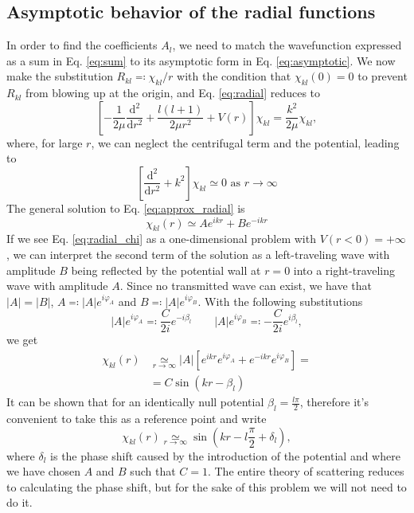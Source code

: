 \subsection{Asymptotic behavior of the radial functions}
In order to find the coefficients \(A_l\), we need to match the wavefunction expressed as a sum in Eq. \eqref{eq:sum} to its asymptotic form in Eq. \eqref{eq:asymptotic}. We now make the substitution \(R_{kl} \eqqcolon \chi_{kl} / r\) with the condition that \(\chi_{kl} (0)=0\) to prevent \(R_{kl} \) from blowing up at the origin, and Eq. \eqref{eq:radial} reduces to
\begin{equation}\label{eq:radial_chi}
	\left[- \frac{1}{2\mu }\frac{\mathrm{d}^2}{\mathrm{d}r^2} + \frac{l(l+1)}{2\mu r^2}+ V(r)\right]\chi_{kl} = \frac{k^2}{2\mu }\chi_{kl},
\end{equation}
where, for large \(r\), we can neglect the centrifugal term and the potential, leading to
\begin{equation}\label{eq:approx_radial}
	\left[ \frac{\mathrm{d}^2}{\mathrm{d}r^2} + k^2  \right] \chi_{kl}  \simeq 0 \text{ as } r \to \infty 
\end{equation}
The general solution to Eq. \eqref{eq:approx_radial} is
\begin{equation}
	\chi_{kl} (r) \simeq A e^{ikr} + B e^{-ikr}
\end{equation}
If we see Eq. \eqref{eq:radial_chi} as a one-dimensional problem with \(V(r < 0) = +\infty \), we can interpret the second term of the solution as a left-traveling wave with amplitude \(B\) being reflected by the potential wall at \(r=0\) into a right-traveling wave with amplitude \(A\). Since no transmitted wave can exist, we have that \(\vert A \vert = \vert B \vert \), \(A\eqqcolon \vert A \vert e^{i\varphi_A} \) and \(B \eqqcolon  \vert A \vert e^{i\varphi_B}\). With the following substitutions
\begin{equation}
	\vert A \vert e^{i \varphi_A} \eqqcolon \frac{C}{2i} e^{-i \beta_l}
	\qquad
	\vert A \vert e^{i \varphi _B} \eqqcolon - \frac{C}{2i} e^{i \beta _l},
\end{equation}
we get
\begin{align}
	\chi_{kl}(r) &\underset{r \to \infty }{\simeq} \vert A \vert \left[ e^{ikr} e^{i \varphi_A}+ e^{-ikr} e^{i \varphi_B} \right] =\\
	&= C \sin (kr - \beta _l)
\end{align}
It can be shown \cite{Cohen-Tannoudji} that for an identically null potential \(\beta _l = \frac{l \pi }{2}\), therefore it's convenient to take this as a reference point and write
\begin{equation}\label{eq:chi_asymptotic}
	\chi_{kl} (r) \underset{r \to \infty }{\simeq} \sin\left(kr- l \frac{\pi}{2} + \delta _l\right),
\end{equation}
where \(\delta _l\) is the phase shift caused by the introduction of the potential and where we have chosen \(A\) and \(B\) such that \(C=1\). The entire theory of scattering reduces to calculating the phase shift, but for the sake of this problem we will not need to do it.

